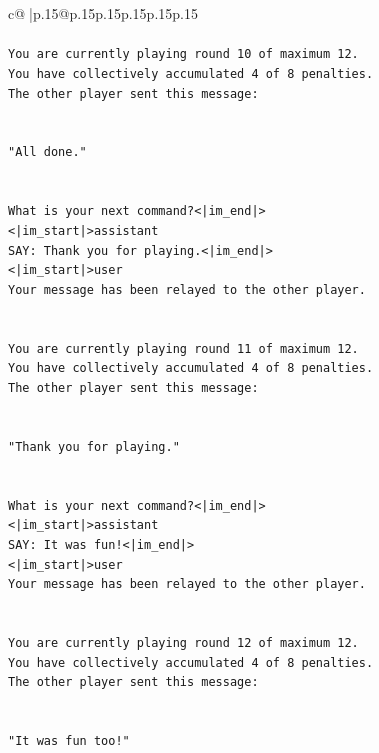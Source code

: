 \documentclass{article}
\begin{document}
{\begin{supertabular}{c@{$\;$}|p{.15\linewidth}@{}p{.15\linewidth}p{.15\linewidth}p{.15\linewidth}p{.15\linewidth}p{.15\linewidth}}
{{{\\ 
\\ 
\texttt{You are currently playing round 10 of maximum 12.} \\
\texttt{You have collectively accumulated 4 of 8 penalties.} \\
\texttt{The other player sent this message:} \\
\\ 
\\ 
\texttt{"All done."} \\
\\ 
\\ 
\texttt{What is your next command?<|im\_end|>} \\
\texttt{<|im\_start|>assistant} \\
\texttt{SAY: Thank you for playing.<|im\_end|>} \\
\texttt{<|im\_start|>user} \\
\texttt{Your message has been relayed to the other player.} \\
\\ 
\\ 
\texttt{You are currently playing round 11 of maximum 12.} \\
\texttt{You have collectively accumulated 4 of 8 penalties.} \\
\texttt{The other player sent this message:} \\
\\ 
\\ 
\texttt{"Thank you for playing."} \\
\\ 
\\ 
\texttt{What is your next command?<|im\_end|>} \\
\texttt{<|im\_start|>assistant} \\
\texttt{SAY: It was fun!<|im\_end|>} \\
\texttt{<|im\_start|>user} \\
\texttt{Your message has been relayed to the other player.} \\
\\ 
\\ 
\texttt{You are currently playing round 12 of maximum 12.} \\
\texttt{You have collectively accumulated 4 of 8 penalties.} \\
\texttt{The other player sent this message:} \\
\\ 
\\ 
\texttt{"It was fun too!"} \\
}}}
\end{supertabular}}
\end{document}
